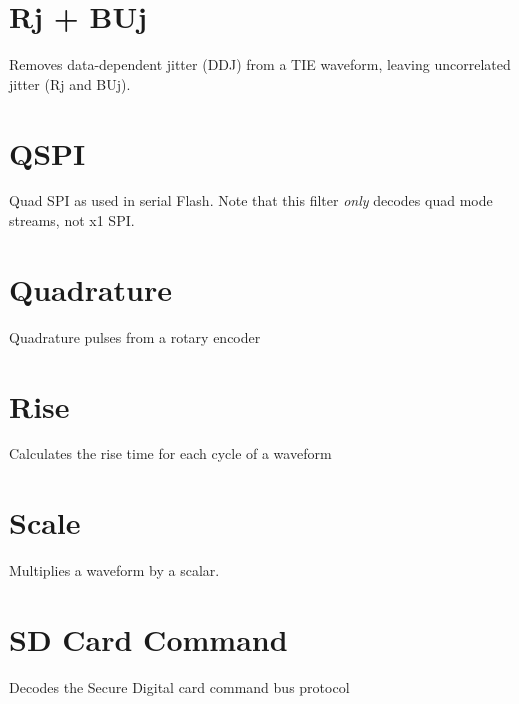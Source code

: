 \section{Rj + BUj}

Removes data-dependent jitter (DDJ) from a TIE waveform, leaving uncorrelated jitter (Rj and BUj).

\pagebreak
\section{QSPI}

Quad SPI as used in serial Flash. Note that this filter \emph{only} decodes quad mode streams, not x1 SPI.

\pagebreak
\section{Quadrature}

Quadrature pulses from a rotary encoder

\pagebreak
\section{Rise}

Calculates the rise time for each cycle of a waveform

\pagebreak
\section{Scale}

Multiplies a waveform by a scalar.

\pagebreak
\section{SD Card Command}

Decodes the Secure Digital card command bus protocol

